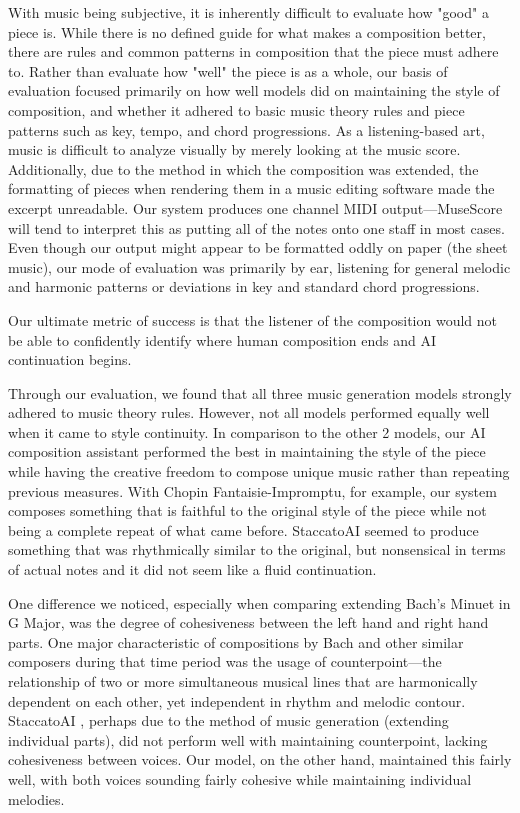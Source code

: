 \documentclass[conference]{IEEEtran}
\begin{document}
With music being subjective, it is inherently difficult to evaluate how "good" a piece is. While there is no defined guide for what makes a composition better, there are rules and common patterns in composition that the piece must adhere to. Rather than evaluate how "well" the piece is as a whole, our basis of evaluation focused primarily on how well models did on maintaining the style of composition, and whether it adhered to basic music theory rules and piece patterns such as key, tempo, and chord progressions. As a listening-based art, music is difficult to analyze visually by merely looking at the music score. Additionally, due to the method in which the composition was extended, the formatting of pieces when rendering them in a music editing software made the excerpt unreadable. Our system produces one channel MIDI output—MuseScore will tend to interpret this as putting all of the notes onto one staff in most cases. Even though our output might appear to be formatted oddly on paper (the sheet music), our mode of evaluation was primarily by ear, listening for general melodic and harmonic patterns or deviations in key and standard chord progressions. 

Our ultimate metric of success is that the listener of the composition would not be able to confidently identify where human composition ends and AI continuation begins. 

Through our evaluation, we found that all three music generation models strongly adhered to music theory rules. However, not all models performed equally well when it came to style continuity. In comparison to the other 2 models, our AI composition assistant performed the best in maintaining the style of the piece while having the creative freedom to compose unique music rather than repeating previous measures. With Chopin Fantaisie-Impromptu, for example, our system composes something that is faithful to the original style of the piece while not being a complete repeat of what came before. StaccatoAI \cite{staccato} seemed to produce something that was rhythmically similar to the original, but nonsensical in terms of actual notes and it did not seem like a fluid continuation. 

One difference we noticed, especially when comparing extending Bach's Minuet in G Major, was the degree of cohesiveness between the left hand and right hand parts. One major characteristic of compositions by Bach and other similar composers during that time period was the usage of counterpoint—the relationship of two or more simultaneous musical lines that are harmonically dependent on each other, yet independent in rhythm and melodic contour. StaccatoAI \cite{staccato}, perhaps due to the method of music generation (extending individual parts), did not perform well with maintaining counterpoint, lacking cohesiveness between voices. Our model, on the other hand, maintained this fairly well, with both voices sounding fairly cohesive while maintaining individual melodies. 
\end{document}
